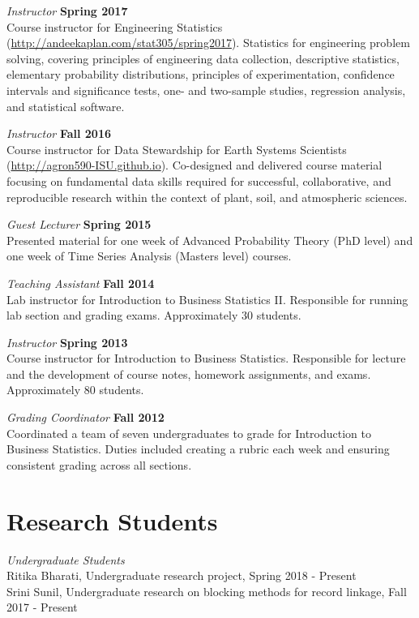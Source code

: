 \documentclass[margin,line]{res}
\begin{document}
\begin{resume}
{\em Instructor} \hfill {\bf Spring 2017}\\
Course instructor for Engineering Statistics (\url{http://andeekaplan.com/stat305/spring2017}). Statistics for engineering problem solving, covering principles of engineering data collection, descriptive statistics, elementary probability distributions, principles of experimentation, confidence intervals and significance tests, one- and two-sample studies, regression analysis, and statistical software.

{\em Instructor} \hfill {\bf Fall 2016}\\
Course instructor for Data Stewardship for Earth Systems Scientists (\url{http://agron590-ISU.github.io}). Co-designed
and delivered course material focusing on fundamental data skills required for successful,
collaborative, and reproducible research within the context of plant, soil, and atmospheric sciences.

{\em Guest Lecturer} \hfill {\bf Spring 2015}\\
Presented material for one week of Advanced Probability Theory (PhD level) and one week of Time Series Analysis (Masters level) courses.

{\em Teaching Assistant} \hfill {\bf Fall 2014}\\
Lab instructor for Introduction to Business Statistics II. Responsible for running lab section and grading exams. Approximately 30 students.

{\em Instructor} \hfill {\bf Spring 2013}\\
Course instructor for Introduction to Business Statistics. Responsible for lecture and the development of course notes, homework assignments, and exams. Approximately 80 students.

{\em Grading Coordinator} \hfill {\bf Fall 2012}\\
Coordinated a team of seven undergraduates to grade for Introduction to Business Statistics. Duties included creating a rubric each week and ensuring consistent grading across all sections.

\section{\sc Research Students}

{\em Undergraduate Students} \hfill \\
Ritika Bharati, Undergraduate research project, Spring 2018 - Present \\
Srini Sunil, Undergraduate research on blocking methods for record linkage, Fall 2017 - Present



\end{resume}
\end{document}
